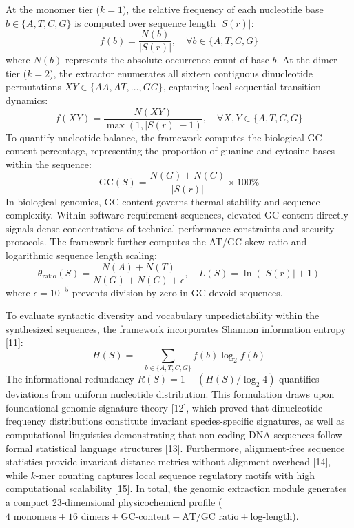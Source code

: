 At the monomer tier ($k=1$), the relative frequency of each nucleotide base $b \in \{A, T, C, G\}$ is computed over sequence length $|S(r)|$:
\begin{equation}
f(b) = \frac{N(b)}{|S(r)|}, \quad \forall b \in \{A, T, C, G\}
\end{equation}
where $N(b)$ represents the absolute occurrence count of base $b$. At the dimer tier ($k=2$), the extractor enumerates all sixteen contiguous dinucleotide permutations $XY \in \{AA, AT, \dots, GG\}$, capturing local sequential transition dynamics:
\begin{equation}
f(XY) = \frac{N(XY)}{\max(1, |S(r)| - 1)}, \quad \forall X, Y \in \{A, T, C, G\}
\end{equation}
To quantify nucleotide balance, the framework computes the biological GC-content percentage, representing the proportion of guanine and cytosine bases within the sequence:
\begin{equation}
\text{GC}(S) = \frac{N(G) + N(C)}{|S(r)|} \times 100\%
\end{equation}
In biological genomics, GC-content governs thermal stability and sequence complexity. Within software requirement sequences, elevated GC-content directly signals dense concentrations of technical performance constraints and security protocols. The framework further computes the AT/GC skew ratio and logarithmic sequence length scaling:
\begin{equation}
\theta_{\text{ratio}}(S) = \frac{N(A) + N(T)}{N(G) + N(C) + \epsilon}, \quad L(S) = \ln(|S(r)| + 1)
\end{equation}
where $\epsilon = 10^{-5}$ prevents division by zero in GC-devoid sequences. 

To evaluate syntactic diversity and vocabulary unpredictability within the synthesized sequences, the framework incorporates Shannon information entropy [11]:
\begin{equation}
H(S) = -\sum_{b \in \{A, T, C, G\}} f(b) \log_2 f(b)
\end{equation}
The informational redundancy $R(S) = 1 - (H(S) / \log_2 4)$ quantifies deviations from uniform nucleotide distribution. This formulation draws upon foundational genomic signature theory [12], which proved that dinucleotide frequency distributions constitute invariant species-specific signatures, as well as computational linguistics demonstrating that non-coding DNA sequences follow formal statistical language structures [13]. Furthermore, alignment-free sequence statistics provide invariant distance metrics without alignment overhead [14], while $k$-mer counting captures local sequence regulatory motifs with high computational scalability [15]. In total, the genomic extraction module generates a compact 23-dimensional physicochemical profile ($4\text{ monomers} + 16\text{ dimers} + \text{GC-content} + \text{AT/GC ratio} + \text{log-length}$).

